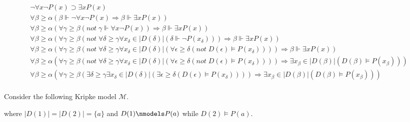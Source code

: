 \documentclass[11pt,a4paper]{article}
\newcommand{\lto}{\supset}
\newcommand{\sneg}{not \;}
\newcommand{\sto}{\Rightarrow}
\newenvironment{changemargin}[2]{%
\begin{list}{}{%
\setlength{\topsep}{0pt}%
\setlength{\leftmargin}{#1}%
\setlength{\rightmargin}{#2}%
\setlength{\listparindent}{\parindent}%
\setlength{\itemindent}{\parindent}%
\setlength{\parsep}{\parskip}%
}%
\item[]}{\end{list}}
\begin{document}
\begin{changemargin}{-1cm}{-1cm}
\begin{align*}
&\neg \forall x \neg P(x) \lto \exists x P(x)   & \\
&\forall \beta \geqslant \alpha (\beta \Vdash \neg \forall x \neg P(x) \sto  \beta \Vdash \exists x P(x) )  & \\
&\forall \beta \geqslant \alpha (\forall \gamma \geqslant \beta (\sneg  \gamma \Vdash  \forall x \neg P(x)) \sto  \beta \Vdash \exists x P(x) )  & \\
&\forall \beta \geqslant \alpha (\forall \gamma \geqslant \beta (\sneg   \forall \delta \geqslant \gamma  \forall x_{\delta} \in |D(\delta)| (\delta \Vdash  \neg P(x_{\delta}))) \sto  \beta \Vdash \exists x P(x) )  &\\
&\forall \beta \geqslant \alpha (\forall \gamma \geqslant \beta (\sneg   \forall \delta \geqslant \gamma  \forall x_{\delta} \in |D(\delta)| (\forall \epsilon \geqslant \delta (\sneg  D(\epsilon) \models P(x_{\delta})))) \sto  \beta \Vdash \exists x P(x) )  &\\
&\forall \beta \geqslant \alpha (\forall \gamma \geqslant \beta (\sneg   \forall \delta \geqslant \gamma  \forall x_{\delta} \in |D(\delta)| (\forall \epsilon \geqslant \delta (\sneg  D(\epsilon) \models P(x_{\delta})))) \sto \exists x_{\beta} \in |D( \beta)| (D(\beta) \models P(x_{\beta}) ))  & \\
&\forall \beta \geqslant \alpha (\forall \gamma \geqslant \beta ( \exists \delta \geqslant \gamma  \exists x_{\delta} \in |D(\delta)| (\exists \epsilon \geqslant \delta ( D(\epsilon) \models P(x_{\delta})))) \sto \exists x_{\beta} \in |D( \beta)| (D(\beta) \models P(x_{\beta}) ))  & \\
\end{align*}
\end{changemargin}

Consider the following Kripke model $\mathcal{M}$.
\begin{center}
\end{center}
where $|D(1)|=|D(2)|=\{a\}$ and $D(1)\nmodels P(a)$ while $D(2)\models P(a)$.
\end{document}
